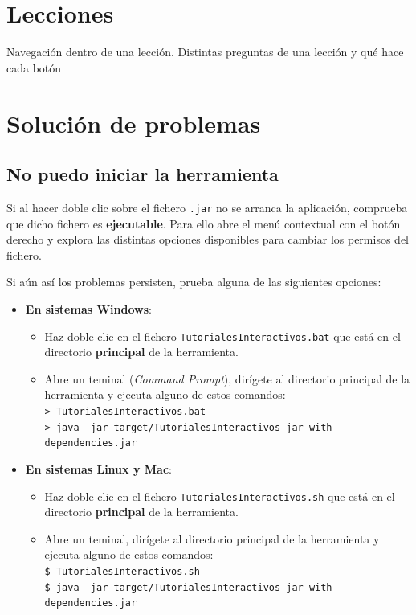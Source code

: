 \documentclass[]{article}
\begin{document}
\section{Lecciones}
Navegación dentro de una lección. Distintas preguntas de una lección y qué hace cada botón

\section{Solución de problemas}

\subsection{No puedo iniciar la herramienta}\label{sec:problemas_arrancar}
Si al hacer doble clic sobre el fichero \texttt{.jar} no se arranca la aplicación, comprueba que dicho fichero es \textbf{ejecutable}. Para ello abre el menú contextual con el botón derecho y explora las distintas opciones disponibles para cambiar los permisos del fichero.

Si aún así los problemas persisten, prueba alguna de las siguientes opciones:
\begin{itemize}
	\item \textbf{En sistemas Windows}: 
	\begin{itemize}
	\item Haz doble clic en el fichero \texttt{TutorialesInteractivos.bat} que está en el directorio \textbf{principal} de la herramienta. 
	\item Abre un teminal (\emph{Command Prompt}), dirígete al directorio principal de la herramienta y ejecuta alguno de estos comandos:
	\\
	{\small \texttt{>\ TutorialesInteractivos.bat}}\\
	{\small \texttt{>\ java -jar target/TutorialesInteractivos-jar-with-dependencies.jar}}\\
	\end{itemize}
	\item \textbf{En sistemas Linux y Mac}:
	\begin{itemize}
		\item Haz doble clic en el fichero \texttt{TutorialesInteractivos.sh} que está en el directorio \textbf{principal} de la herramienta. 
		\item Abre un teminal, dirígete al directorio principal de la herramienta y ejecuta alguno de estos comandos:
		\\
		{\small \texttt{\$ TutorialesInteractivos.sh}}\\
		{\small \texttt{\$ java -jar target/TutorialesInteractivos-jar-with-dependencies.jar}}\\
	\end{itemize}
\end{itemize}	
	
\end{document}
